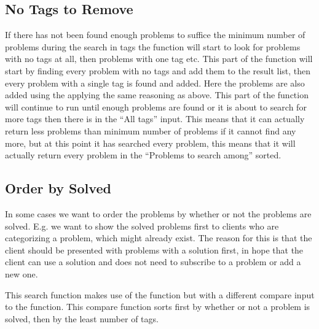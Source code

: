 \subsection{No Tags to Remove}
\label{sub:noTags}
If there has not been found enough problems to suffice the minimum number of problems during the search in tags the function will start to look for problems with no tags at all, then problems with one tag etc.
This part of the function will start by finding every problem with no tags and add them to the result list, then every problem with a single tag is found and added.
Here the problems are also added using the  applying the same reasoning as above.
This part of the function will continue to run until enough problems are found or it is about to search for more tags then there is in the ``All tags'' input.
This means that it can actually return less problems than minimum number of problems if it cannot find any more, but at this point it has searched every problem, this means that it will actually return every problem in the ``Problems to search among'' sorted.

\subsection{Order by Solved}
\label{sub:orderSolved}
In some cases we want to order the problems by whether or not the problems are solved.
E.g. we want to show the solved problems first to clients who are categorizing a problem, which might already exist.
The reason for this is that the client should be presented with problems with a solution first, in hope that the client can use a solution and does not need to subscribe to a problem or add a new one.

This search function makes use of the  function but with a different compare input to the  function.
This compare function sorts first by whether or not a problem is solved, then by the least number of tags.